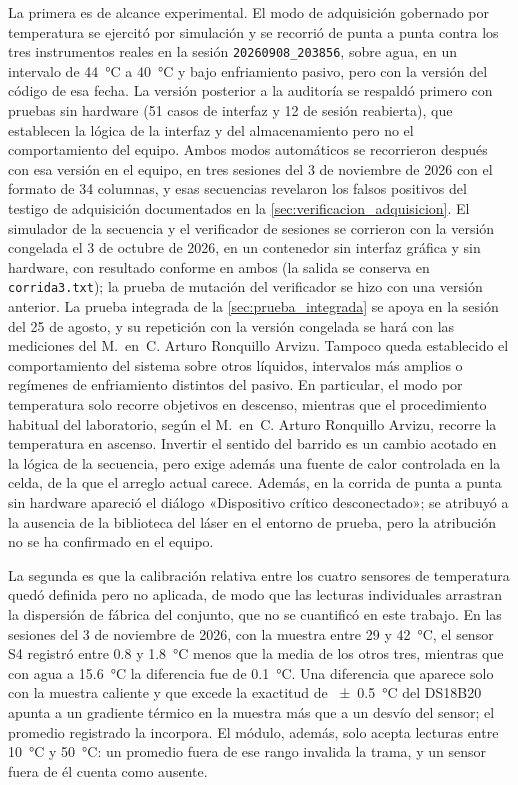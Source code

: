 La primera es de alcance experimental. El modo de adquisición gobernado
por temperatura se ejercitó por simulación y se recorrió de punta a
punta contra los tres instrumentos reales en la sesión
\texttt{20260908\_203856}, sobre agua, en un intervalo de
\SI{44}{\celsius} a \SI{40}{\celsius} y bajo enfriamiento pasivo, pero
con la versión del código de esa fecha. La versión posterior a la auditoría
se respaldó primero con pruebas sin hardware (51 casos de interfaz y
12 de sesión reabierta), que establecen la lógica de la interfaz y del
almacenamiento pero no el comportamiento del equipo. Ambos modos
automáticos se recorrieron después con esa versión en el equipo, en
tres sesiones del 3 de noviembre de 2026 con el formato de 34
columnas, y esas secuencias revelaron los falsos positivos del testigo
de adquisición documentados en la \cref{sec:verificacion_adquisicion}. El
simulador de la secuencia y el verificador de sesiones se corrieron con
la versión congelada el 3 de octubre de 2026, en un contenedor sin
interfaz gráfica y sin hardware, con resultado conforme en ambos
(la salida se conserva en \texttt{corrida3.txt}); la prueba de mutación
del verificador se hizo con una versión anterior. La prueba integrada de la
\cref{sec:prueba_integrada} se apoya en la sesión del 25 de agosto, y su
repetición con la versión congelada se hará con las mediciones del
M.~en~C. Arturo Ronquillo Arvizu. Tampoco queda establecido el
comportamiento del sistema sobre otros líquidos, intervalos más amplios
o regímenes de enfriamiento distintos del pasivo. En particular, el
modo por temperatura solo recorre objetivos en descenso, mientras que
el procedimiento habitual del laboratorio, según el M.~en~C. Arturo
Ronquillo Arvizu, recorre la temperatura en ascenso. Invertir el
sentido del barrido es un cambio acotado en la lógica de la secuencia,
pero exige además una fuente de calor controlada en la celda, de la
que el arreglo actual carece. Además, en la corrida
de punta a punta sin hardware apareció el diálogo «Dispositivo crítico
desconectado»; se atribuyó a la ausencia de la biblioteca del láser en
el entorno de prueba, pero la atribución no se ha confirmado en el
equipo.

La segunda es que la calibración relativa entre los cuatro sensores de
temperatura quedó definida pero no aplicada, de modo que las lecturas
individuales arrastran la dispersión de fábrica del conjunto, que no se
cuantificó en este trabajo. En las sesiones del 3 de noviembre de 2026,
con la muestra entre 29 y \SI{42}{\celsius}, el sensor S4 registró
entre 0.8 y \SI{1.8}{\celsius} menos que la media de los otros tres,
mientras que con agua a \SI{15.6}{\celsius} la diferencia fue de
\SI{+0.1}{\celsius}. Una diferencia que aparece solo con la muestra
caliente y que excede la exactitud de \SI{\pm0.5}{\celsius} del
DS18B20 apunta a un gradiente térmico en la muestra más que a un desvío
del sensor; el promedio registrado la incorpora. El módulo, además, solo acepta lecturas
entre \SI{10}{\celsius} y \SI{50}{\celsius}: un promedio fuera de ese
rango invalida la trama, y un sensor fuera de él cuenta como ausente.

